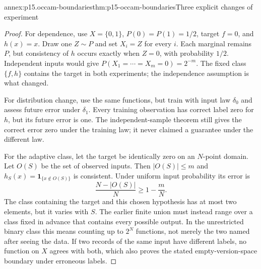 \begin{annexitem}{annex:p15.occam-boundaries}{thm:p15-occam-boundaries}{Three explicit changes of experiment}
\begin{proof}
For dependence, use \(X=\{0,1\}\), \(P(0)=P(1)=1/2\),
target \(f=0\), and \(h(x)=x\). Draw one \(Z\sim P\)
and set \(X_i=Z\) for every \(i\). Each marginal remains
\(P\), but consistency of \(h\) occurs exactly when
\(Z=0\), with probability \(1/2\). Independent inputs
would give \(P(X_1=\cdots=X_m=0)=2^{-m}\).
The fixed class \(\{f,h\}\) contains the target in both
experiments; the independence assumption is what changed.

For distribution change, use the same functions, but
train with input law \(\delta_0\) and assess future
error under \(\delta_1\). Every training observation
has correct label zero for \(h\), but its future error
is one. The independent-sample theorem still gives
the correct error zero under the training law; it
never claimed a guarantee under the different law.

For the adaptive class, let the target be identically
zero on an \(N\)-point domain. Let \(O(S)\) be the
set of observed inputs. Then \(|O(S)|\leq m\) and
\(h_S(x)=\mathbf1_{\{x\notin O(S)\}}\) is consistent.
Under uniform input probability its error is
\[
                  \frac{N-|O(S)|}{N}\geq1-\frac mN.
\]
The class containing the target and this chosen
hypothesis has at most two elements, but it varies
with \(S\). The earlier finite union must instead
range over a class fixed in advance that contains
every possible output. In the unrestricted binary
class this means counting up to \(2^N\) functions,
not merely the two named after seeing the data.
If two records of the same input have different
labels, no function on \(X\) agrees with both,
which also proves the stated empty-version-space
boundary under erroneous labels.
\end{proof}
\end{annexitem}

